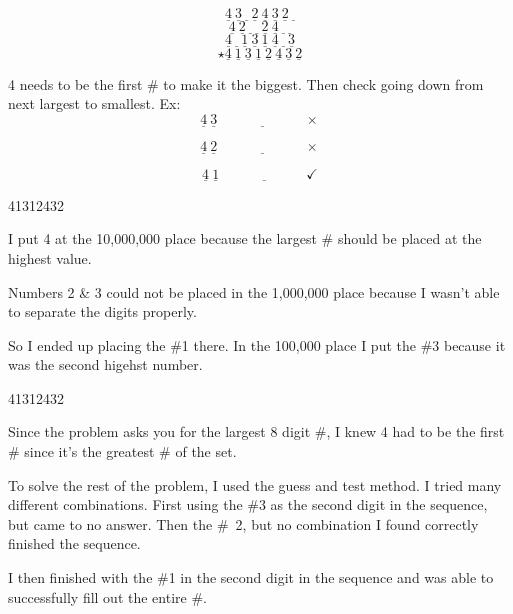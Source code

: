 \begin{sol*}[Solution 5]
\[
\underline{4} \ \underline{3} \ \underline{\ } \ \underline{2}\  \underline{4}\ \underline{3} \ \underline{2} \ \underline{\ }
\]
\[
\underline{4} \ \underline{2} \ \underline{\ } \ \underline{\ }\  \underline{2}\ \underline{4} \ \underline{\ } \ \underline{\ }
\]
\[
\underline{4} \ \underline{\ } \ \underline{1} \ \underline{3}\  \underline{1}\ \underline{4} \ \underline{\ } \ \underline{3 }
\]
\[
\star \underline{4} \ \underline{1} \ \underline{ 3} \ \underline{1}\  \underline{2}\ \underline{4} \ \underline{3} \ \underline{2}
\]



4 needs to be the first \# to make it the biggest.  Then check going down from next largest to smallest.  Ex:
\[
\underline{4} \ \underline{3} \ \underline{\qquad \qquad \qquad  } \times
\]

\[
\underline{4} \ \underline{2} \ \underline{\qquad \qquad \qquad  } \times
\]

\[
\underline{4} \ \underline{1} \ \underline{\qquad \qquad \qquad  } \checkmark
\]

\end{sol*}


\begin{sol*}[Solution 6]
41312432



I put 4 at the 10,000,000 place because the largest \# should be placed at the highest value.




Numbers 2 \& 3 could not be placed in the 1,000,000 place because I wasn't able to separate the digits properly.




So I ended up placing the \#1 there.  In the 100,000 place I put the \#3 because it was the second higehst number.

\end{sol*}



\begin{sol*}[Solution 7]

41312432



Since the problem asks you for the largest 8 digit \#, I knew 4 had to be the first \# since it's the greatest \# of the set.





To solve the rest of the problem, I used the guess and test method.  I tried many different combinations.  First using the \#3 as the second digit in the sequence, but came to no answer.  Then the \#~2, but no combination I found  correctly finished the sequence.



I then finished with the \#1 in the second digit in the sequence and was able to successfully fill out the entire \#.

\end{sol*}




